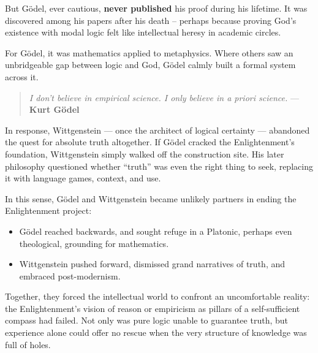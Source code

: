 \begin{tcolorbox}[colback=blue!5!white, colframe=blue!50!black, title=Historical Sidebar: Truth vs Games]
\medskip

But Gödel, ever cautious, \textbf{never published} his proof during his lifetime. It was discovered among his papers after his death -- perhaps because proving God’s existence with modal logic felt like intellectual heresy in academic circles.

\medskip

For Gödel, it was mathematics applied to metaphysics. Where others saw an unbridgeable gap between logic and God, Gödel calmly built a formal system across it.

\begin{quote}
    \emph{I don’t believe in empirical science. I only believe in a priori science.} — \textbf{Kurt Gödel}
\end{quote}

\end{tcolorbox}

\medskip

In response, Wittgenstein --- once the architect of logical certainty --- abandoned the quest for absolute truth altogether. If Gödel cracked the Enlightenment's foundation, Wittgenstein simply walked off the construction site. His later philosophy questioned whether ``truth'' was even the right thing to seek, replacing it with language games, context, and use.

In this sense, Gödel and Wittgenstein became unlikely partners in ending the Enlightenment project:

\begin{itemize}
  \item Gödel reached backwards, and sought refuge in a Platonic, perhaps even theological, grounding for mathematics.
  \item Wittgenstein pushed forward, dismissed grand narratives of truth, and embraced post-modernism.
\end{itemize}

Together, they forced the intellectual world to confront an uncomfortable reality: the Enlightenment's vision of reason or empiricism as pillars of a self-sufficient compass had failed. Not only was pure logic unable to guarantee truth, but experience alone could offer no rescue when the very structure of knowledge was full of holes.


